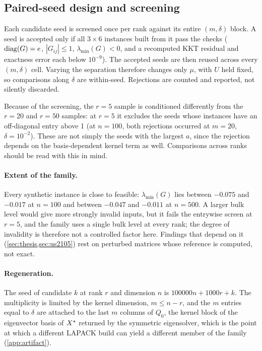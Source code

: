 \subsection{Paired-seed design and screening}\label{sec:paired}
Each candidate seed is screened once per rank against its entire
$(m,\delta)$ block. A seed is accepted only if all $3\times6$ instances built
from it pass the checks ($\operatorname{diag}(G)=e$, $|G_{ij}|\le1$, $\lambda_{\min}(G)<0$,
and a recomputed KKT residual and exactness error each below $10^{-9}$). The
accepted seeds are then reused across every $(m,\delta)$ cell. Varying the
separation therefore changes only $\mu$, with $U$ held fixed, so comparisons
along $\delta$ are within-seed. Rejections are counted and reported, not
silently discarded.

Because of the screening, the $r=5$ sample is conditioned differently from the
$r=20$ and $r=50$ samples: at $r=5$ it excludes the seeds whose instances have
an off-diagonal entry above 1 (at $n=100$, both rejections occurred at $m=20$,
$\delta=10^{-2}$). These are not simply the seeds with the largest $a$, since
the rejection depends on the basis-dependent kernel term as well.
Comparisons across ranks should be read with this in mind.

\paragraph{Extent of the family.}
Every synthetic instance is close to feasible: $\lambda_{\min}(G)$ lies between
$-0.075$ and $-0.017$ at $n=100$ and between $-0.047$ and $-0.011$ at $n=500$.
A larger bulk level would give more strongly invalid inputs, but it fails the
entrywise screen at $r=5$, and the family uses a single bulk level at every
rank; the degree of invalidity is therefore not a controlled factor here.
Findings that depend on it (\cref{sec:thesis,sec:us2105}) rest on perturbed
matrices whose reference is computed, not exact.

\paragraph{Regeneration.}
The seed of candidate $k$ at rank $r$ and dimension $n$ is $100000n+1000r+k$.
The multiplicity is limited by the kernel dimension, $m\le n-r$, and the $m$
entries equal to $\delta$ are attached to the last $m$ columns of $Q_0$, the
kernel block of the eigenvector basis of $X^\star$ returned by the symmetric
eigensolver, which is the point at which a
different LAPACK build can yield a different member of the family
(\cref{app:artifact}).

